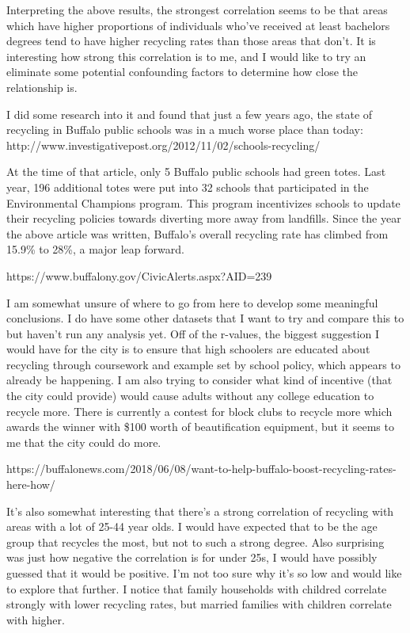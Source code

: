 \documentclass[11pt]{article}
\begin{document}
    Interpreting the above results, the strongest correlation seems to be
that areas which have higher proportions of individuals who've received
at least bachelors degrees tend to have higher recycling rates than
those areas that don't. It is interesting how strong this correlation is
to me, and I would like to try an eliminate some potential confounding
factors to determine how close the relationship is.

I did some research into it and found that just a few years ago, the
state of recycling in Buffalo public schools was in a much worse place
than today:
http://www.investigativepost.org/2012/11/02/schools-recycling/

At the time of that article, only 5 Buffalo public schools had green
totes. Last year, 196 additional totes were put into 32 schools that
participated in the Environmental Champions program. This program
incentivizes schools to update their recycling policies towards
diverting more away from landfills. Since the year the above article was
written, Buffalo's overall recycling rate has climbed from 15.9\% to
28\%, a major leap forward.

https://www.buffalony.gov/CivicAlerts.aspx?AID=239

I am somewhat unsure of where to go from here to develop some meaningful
conclusions. I do have some other datasets that I want to try and
compare this to but haven't run any analysis yet. Off of the r-values,
the biggest suggestion I would have for the city is to ensure that high
schoolers are educated about recycling through coursework and example
set by school policy, which appears to already be happening. I am also
trying to consider what kind of incentive (that the city could provide)
would cause adults without any college education to recycle more. There
is currently a contest for block clubs to recycle more which awards the
winner with \$100 worth of beautification equipment, but it seems to me
that the city could do more.

https://buffalonews.com/2018/06/08/want-to-help-buffalo-boost-recycling-rates-here-how/

It's also somewhat interesting that there's a strong correlation of
recycling with areas with a lot of 25-44 year olds. I would have
expected that to be the age group that recycles the most, but not to
such a strong degree. Also surprising was just how negative the
correlation is for under 25s, I would have possibly guessed that it
would be positive. I'm not too sure why it's so low and would like to
explore that further. I notice that family households with childred
correlate strongly with lower recycling rates, but married families with
children correlate with higher.
\end{document}
